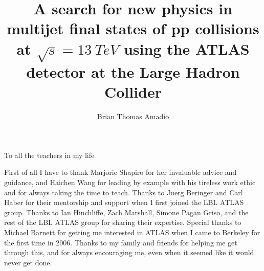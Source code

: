 \documentclass{ucbthesis}
\begin{document}

\title{
\textnormal{A search for new physics in multijet
  final states of pp collisions at $\sqrt{s} = 13~TeV$ using the ATLAS
  detector at the Large Hadron Collider}
}

\author{Brian Thomas Amadio}


\maketitle
\copyrightpage



\begin{frontmatter}

\begin{dedication}
\null\vfil
\begin{center}

To all the teachers in my life
    \\\vspace{12pt}

\end{center}
\vfil\null
\end{dedication}


\tableofcontents
\clearpage
\listoffigures
\clearpage
\listoftables

\begin{acknowledgements}

First of all I have to thank Marjorie Shapiro for her invaluable advice and guidance, and Haichen Wang for leading by example with his tireless work ethic and for always taking the time to teach.
Thanks to Juerg Beringer and Carl Haber for their mentorship and support when I first joined the LBL ATLAS group.
Thanks to Ian Hinchliffe, Zach Marshall, Simone Pagan Griso, and the rest of the LBL ATLAS group for sharing their expertise.
Special thanks to Michael Barnett for getting me interested in ATLAS when I came to Berkeley for the first time in 2006.
Thanks to my family and friends for helping me get through this, and for always encouraging me, even when it seemed like it would never get done.

\end{acknowledgements}

\end{frontmatter}
\end{document}
